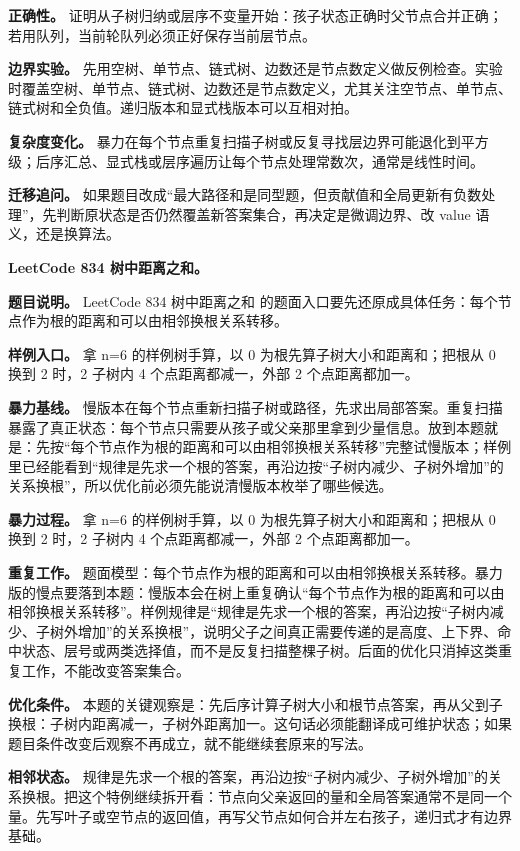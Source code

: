 \textbf{正确性。} 证明从子树归纳或层序不变量开始：孩子状态正确时父节点合并正确；若用队列，当前轮队列必须正好保存当前层节点。

\textbf{边界实验。} 先用空树、单节点、链式树、边数还是节点数定义做反例检查。实验时覆盖空树、单节点、链式树、边数还是节点数定义，尤其关注空节点、单节点、链式树和全负值。递归版本和显式栈版本可以互相对拍。

\textbf{复杂度变化。} 暴力在每个节点重复扫描子树或反复寻找层边界可能退化到平方级；后序汇总、显式栈或层序遍历让每个节点处理常数次，通常是线性时间。

\textbf{迁移追问。} 如果题目改成“最大路径和是同型题，但贡献值和全局更新有负数处理”，先判断原状态是否仍然覆盖新答案集合，再决定是微调边界、改 value 语义，还是换算法。

\noindent\textbf{LeetCode 834 树中距离之和。}

\textbf{题目说明。} LeetCode 834 树中距离之和 的题面入口要先还原成具体任务：每个节点作为根的距离和可以由相邻换根关系转移。

\textbf{样例入口。} 拿 n=6 的样例树手算，以 0 为根先算子树大小和距离和；把根从 0 换到 2 时，2 子树内 4 个点距离都减一，外部 2 个点距离都加一。

\textbf{暴力基线。} 慢版本在每个节点重新扫描子树或路径，先求出局部答案。重复扫描暴露了真正状态：每个节点只需要从孩子或父亲那里拿到少量信息。放到本题就是：先按“每个节点作为根的距离和可以由相邻换根关系转移”完整试慢版本；样例里已经能看到“规律是先求一个根的答案，再沿边按“子树内减少、子树外增加”的关系换根”，所以优化前必须先能说清慢版本枚举了哪些候选。

\textbf{暴力过程。} 拿 n=6 的样例树手算，以 0 为根先算子树大小和距离和；把根从 0 换到 2 时，2 子树内 4 个点距离都减一，外部 2 个点距离都加一。

\textbf{重复工作。} 题面模型：每个节点作为根的距离和可以由相邻换根关系转移。暴力版的慢点要落到本题：慢版本会在树上重复确认“每个节点作为根的距离和可以由相邻换根关系转移”。样例规律是“规律是先求一个根的答案，再沿边按“子树内减少、子树外增加”的关系换根”，说明父子之间真正需要传递的是高度、上下界、命中状态、层号或两类选择值，而不是反复扫描整棵子树。后面的优化只消掉这类重复工作，不能改变答案集合。

\textbf{优化条件。} 本题的关键观察是：先后序计算子树大小和根节点答案，再从父到子换根：子树内距离减一，子树外距离加一。这句话必须能翻译成可维护状态；如果题目条件改变后观察不再成立，就不能继续套原来的写法。

\textbf{相邻状态。} 规律是先求一个根的答案，再沿边按“子树内减少、子树外增加”的关系换根。把这个特例继续拆开看：节点向父亲返回的量和全局答案通常不是同一个量。先写叶子或空节点的返回值，再写父节点如何合并左右孩子，递归式才有边界基础。

